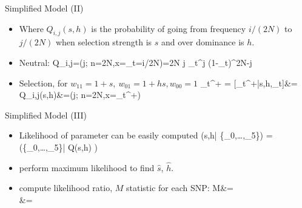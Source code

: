 \documentclass[t]{beamer} %
\begin{document}
\begin{frame}{ Simplified Model (II)}
	\begin{itemize}
		\item  Where $Q_{i,j}(s,h)$ is the probability of going from frequency 
		$i/(2N)$ to $j/(2N)$ when selection strength is $s$ and over dominance 
		is $h$. 
		\item Neutral:  
		\beqq
		Q_{i,j}=\pr(j; n=2N,x=\nu_t=i/2N)={2N \choose j} 
			 \nu_{t}^j
			(1-\nu_{t})^{2N-j}
		\eeqq
		\item Selection, for $w_{11}=1+s,\ w_{01}=1+hs, w_{00}=1$
		\beqq 
		\hat{\nu}_{t^+} =
		[\nu_{t^+}|s,h,\nu_t]&=\\
					Q_{i,j}(s,h)&=\pr(j; n=2N,x=\hat{\nu}_{t^+})
		\label{eq:transition}
		\eeqq
	\end{itemize}
\end{frame}
\begin{frame}{ Simplified Model (III)}
	\begin{itemize}
		\item Likelihood of parameter can be easily computed
		\beqq
		\Lc(s,h| \{\nu_0,\ldots,\nu_5\}) = \pr(\{\nu_0,\ldots,\nu_5\}| Q(s,h) )
		\eeqq
		\pause
		\item perform maximum likelihood to find $\hat{s}$, $\hat{h}$.
		\pause
		\item compute likelihood ratio, $M$ statistic for each SNP:
		\beqq
		M&=\\
		&=
		\eeqq
	\end{itemize}
\end{frame}
\end{document}

